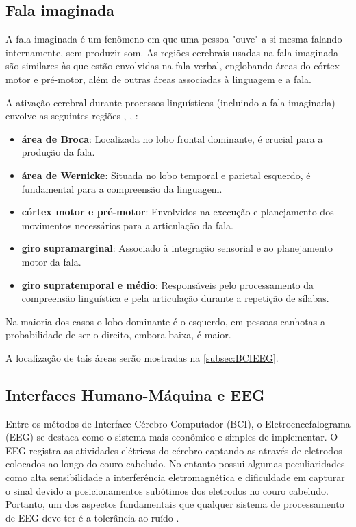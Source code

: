 		\subsection{Fala imaginada}
			\par A fala imaginada é um fenômeno em que uma pessoa "ouve" a si mesma falando internamente, sem produzir som. As regiões cerebrais usadas na fala imaginada são similares às que estão envolvidas na fala verbal, englobando áreas do córtex motor e pré-motor, além de outras áreas associadas à linguagem e a fala.
			
			\par A ativação cerebral durante processos linguísticos (incluindo a fala imaginada) envolve as seguintes regiões \cite{pinto2012manual}, \cite{Vanderah2020}, \cite{kenhub}:
			
			\begin{itemize}
				\item \textbf{área de Broca}: Localizada no lobo frontal dominante, é crucial para a produção da fala.
				\item \textbf{área de Wernicke}: Situada no lobo temporal e parietal esquerdo, é fundamental para a compreensão da linguagem.
				\item \textbf{córtex motor e pré-motor}: Envolvidos na execução e planejamento dos movimentos necessários para a articulação da fala.
				\item \textbf{giro supramarginal}: Associado à integração sensorial e ao planejamento motor da fala.
				\item \textbf{giro supratemporal e médio}: Responsáveis pelo processamento da compreensão linguística e pela articulação durante a repetição de sílabas.
			\end{itemize}
			
			\par Na maioria dos casos o lobo dominante é o esquerdo, em pessoas canhotas a probabilidade de ser o direito, embora baixa, é maior.

			\par A localização de tais áreas serão mostradas na \autoref{subsec:BCIEEG}.
	
		\subsection{Interfaces Humano-Máquina e EEG}
			\label{subsec:BCIEEG}
			
			\par Entre os métodos de Interface Cérebro-Computador (BCI), o Eletroencefalograma (EEG) se destaca como o sistema mais econômico e simples de implementar. O EEG registra as atividades elétricas do cérebro captando-as através de eletrodos colocados ao longo do couro cabeludo. No entanto possui algumas peculiaridades como alta sensibilidade a interferência eletromagnética e dificuldade em capturar o sinal devido a posicionamentos subótimos dos eletrodos no couro cabeludo. Portanto, um dos aspectos fundamentais que qualquer sistema de processamento de EEG deve ter é a tolerância ao ruído \cite{JALALYBIDGOLY2020101788}.
			
